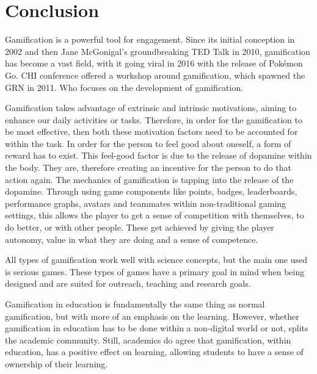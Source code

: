 \chapter{Conclusion}
\label{chap:conclusion}



	Gamification is a powerful tool for engagement. Since its initial conception in 2002 and then Jane McGonigal's groundbreaking TED Talk in 2010, gamification has become a vast field, with it going viral in 2016 with the release of Pokémon Go. \ac{CHI} conference offered a workshop around gamification, which spawned the \ac{GRN} in 2011. Who focuses on the development of gamification.
	
	Gamification takes advantage of extrinsic and intrinsic motivations, aiming to enhance our daily activities or tasks. Therefore, in order for the gamification to be most effective, then both these motivation factors need to be accounted for within the task. In order for the person to feel good about oneself, a form of reward has to exist. This feel-good factor is due to the release of dopamine within the body. They are, therefore creating an incentive for the person to do that action again. The mechanics of gamification is tapping into the release of the dopamine. Through using game components like points, badges, leaderboards, performance graphs, avatars and teammates within non-traditional gaming settings, this allows the player to get a sense of competition with themselves, to do better, or with other people. These get achieved by giving the player autonomy, value in what they are doing and a sense of competence.
	
	All types of gamification work well with science concepts, but the main one used is serious games. These types of games have a primary goal in mind when being designed and are suited for outreach, teaching and research goals.
	
	Gamification in education is fundamentally the same thing as normal gamification, but with more of an emphasis on the learning. However, whether gamification in education has to be done within a non-digital world or not, splits the academic community. Still, academics do agree that gamification, within education, has a positive effect on learning, allowing students to have a sense of ownership of their learning.
	
